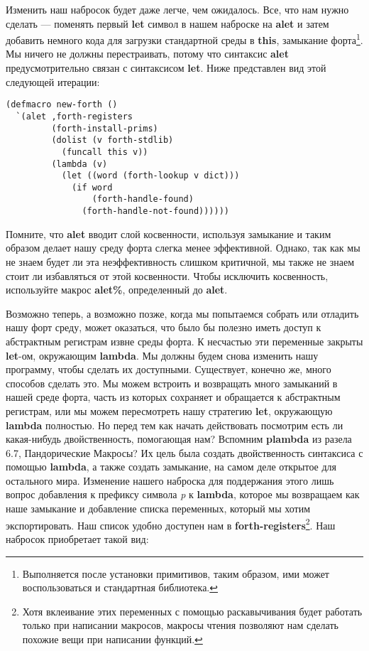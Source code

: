 Изменить наш набросок будет даже легче, чем ожидалось. Все, что нам нужно сделать --- поменять первый \textbf{let} символ в нашем наброске на \textbf{alet} и затем добавить немного кода для загрузки стандартной среды в \textbf{this}, замыкание форта\footnote{Выполняется после установки примитивов, таким образом, ими может воспользоваться и стандартная библиотека.}. Мы ничего не должны перестраивать, потому что синтаксис \textbf{alet} предусмотрительно связан с синтаксисом \textbf{let}. Ниже представлен вид этой следующей итерации:

\begin{verbatim}
(defmacro new-forth ()
  `(alet ,forth-registers
         (forth-install-prims)
         (dolist (v forth-stdlib)
           (funcall this v))
         (lambda (v)
           (let ((word (forth-lookup v dict)))
             (if word
                 (forth-handle-found)
               (forth-handle-not-found))))))
\end{verbatim}

Помните, что \textbf{alet} вводит слой косвенности, используя замыкание и таким образом делает нашу среду форта слегка менее эффективной. Однако, так как мы не знаем будет ли эта неэффективность слишком критичной, мы также не знаем стоит ли избавляться от этой косвенности. Чтобы исключить косвенность, используйте макрос \textbf{alet\%}, определенный до \textbf{alet}.

Возможно теперь, а возможно позже, когда мы попытаемся собрать или отладить нашу форт среду, может оказаться, что было бы полезно иметь доступ к абстрактным регистрам извне среды форта. К несчастью эти переменные закрыты \textbf{let}-ом, окружающим \textbf{lambda}. Мы должны будем снова изменить нашу программу, чтобы сделать их доступными. Существует, конечно же, много способов сделать это. Мы можем встроить и возвращать много замыканий в нашей среде форта, часть из которых сохраняет и обращается к абстрактным регистрам, или мы можем пересмотреть нашу стратегию \textbf{let}, окружающую \textbf{lambda} полностью. Но перед тем как начать действовать посмотрим есть ли какая-нибудь двойственность, помогающая нам? Вспомним \textbf{plambda} из разела 6.7, Пандорические Макросы? Их цель была создать двойственность синтаксиса с помощью \textbf{lambda}, а также создать замыкание, на самом деле открытое для остального мира. Изменение нашего наброска для поддержания этого лишь вопрос добавления к префиксу символа \emph{p} к \textbf{lambda}, которое мы возвращаем как наше замыкание и добавление списка переменных, который мы хотим экспортировать. Наш список удобно доступен нам в \textbf{forth-registers}\footnote{Хотя вклеивание этих переменных с помощью раскавычивания будет работать только при написании макросов, макросы чтения позволяют нам сделать похожие вещи при написании функций.}. Наш набросок приобретает такой вид:

